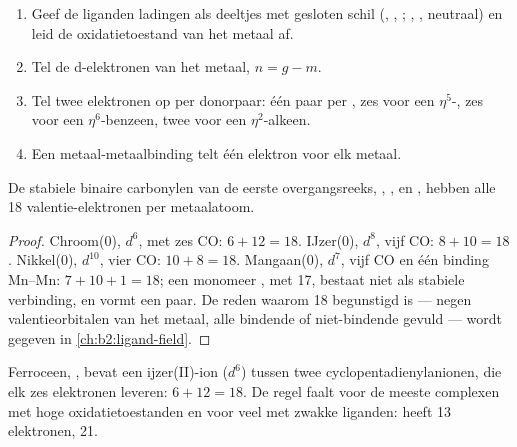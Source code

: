 \begin{method}\label{met:b2:coordination-complexes:electron-count}
\begin{enumerate}
  \item Geef de liganden ladingen als deeltjes met gesloten schil (, ,
        ; , ,  neutraal) en leid de oxidatietoestand
        van het metaal af.
  \item Tel de d-elektronen van het metaal, $n = g - m$.
  \item Tel twee elektronen op per donorpaar: één paar per , zes voor een
        $\eta^5$-, zes voor een $\eta^6$-benzeen, twee voor een $\eta^2$-alkeen.
  \item Een metaal-metaalbinding telt één elektron voor elk metaal.
\end{enumerate}
\end{method}

\begin{proposition}[Metaalcarbonylen]\label{prop:b2:coordination-complexes:eighteen}
De stabiele binaire carbonylen van de eerste overgangsreeks, ,
,  en , hebben alle 18 valentie-elektronen per
metaalatoom.
\end{proposition}

\begin{proof}
Chroom(0), $d^6$, met zes CO: $6 + 12 = 18$. IJzer(0), $d^8$, vijf CO: $8 + 10 = 18$.
Nikkel(0), $d^{10}$, vier CO: $10 + 8 = 18$. Mangaan(0), $d^7$, vijf CO en één
binding Mn--Mn: $7 + 10 + 1 = 18$; een monomeer , met 17, bestaat niet als
stabiele verbinding, en vormt een paar. De reden waarom 18 begunstigd is --- negen valentieorbitalen
van het metaal, alle bindende of niet-bindende gevuld --- wordt gegeven in
\cref{ch:b2:ligand-field}.
\end{proof}

Ferroceen, , bevat een ijzer(II)-ion ($d^6$) tussen twee
cyclopentadienylanionen, die elk zes elektronen leveren: $6 + 12 = 18$. De regel faalt voor
de meeste complexen met hoge oxidatietoestanden en voor veel met zwakke liganden: 
heeft 13 elektronen,  21.

